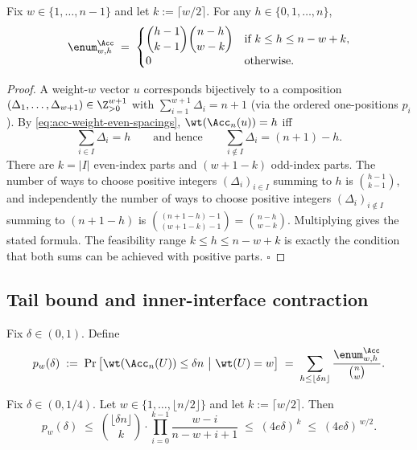 \begin{lemma}
\label{lem:acc-enumerator-exact}
Fix \(w\in\{1,\dots,n-1\}\) and let \(k:=\lceil w/2\rceil\).
For any \(h\in\{0,1,\dots,n\}\),
\[
\enum^{\Acc}_{w,h}
\;=\;
\begin{cases}
\displaystyle \binom{h-1}{k-1}\binom{n-h}{w-k}
& \text{if } k \le h \le n-w+k,\\[1.0ex]
0 & \text{otherwise.}
\end{cases}
\]
\end{lemma}

\begin{proof}
A weight-\(w\) vector \(u\) corresponds bijectively to a composition
\((\Delta_1,\dots,\Delta_{w+1})\in\Z_{>0}^{w+1}\) with \(\sum_{i=1}^{w+1}\Delta_i=n+1\)
(via the ordered one-positions \(p_i\)).
By \eqref{eq:acc-weight-even-spacings}, \(\wt(\Acc_n(u))=h\) iff
\[
\sum_{i\in I}\Delta_i=h
\qquad\text{and hence}\qquad
\sum_{i\notin I}\Delta_i=(n+1)-h.
\]
There are \(k=|I|\) even-index parts and \((w+1-k)\) odd-index parts.
The number of ways to choose positive integers \((\Delta_i)_{i\in I}\) summing to \(h\) is \(\binom{h-1}{k-1}\),
and independently the number of ways to choose positive integers \((\Delta_i)_{i\notin I}\) summing to \((n+1-h)\)
is \(\binom{(n+1-h)-1}{(w+1-k)-1}=\binom{n-h}{w-k}\).
Multiplying gives the stated formula. The feasibility range \(k\le h\le n-w+k\) is exactly the condition that both sums
can be achieved with positive parts. \(\square\)
\end{proof}

\subsection{Tail bound and inner-interface contraction}
\label{subsec:acc-contraction}

Fix \(\delta\in(0,1)\). Define
\[
p_w(\delta)
\;:=\;
\Pr\big[\wt(\Acc_n(U))\le \delta n \ \big|\ \wt(U)=w\big]
\;=\;
\sum_{h\le \lfloor \delta n\rfloor}\frac{\enum^{\Acc}_{w,h}}{\binom{n}{w}}.
\]

\begin{lemma}
\label{lem:acc-tail-contraction}
Fix \(\delta\in(0,1/4)\). Let \(w\in\{1,\dots,\lfloor n/2\rfloor\}\) and let \(k:=\lceil w/2\rceil\).
Then
\[
p_w(\delta)
\;\le\;
\binom{\lfloor \delta n\rfloor}{k}\cdot \prod_{i=0}^{k-1}\frac{w-i}{n-w+i+1}
\;\le\;
(4e\delta)^{\,k}
\;\le\;
(4e\delta)^{\,w/2}.
\]
\end{lemma}

